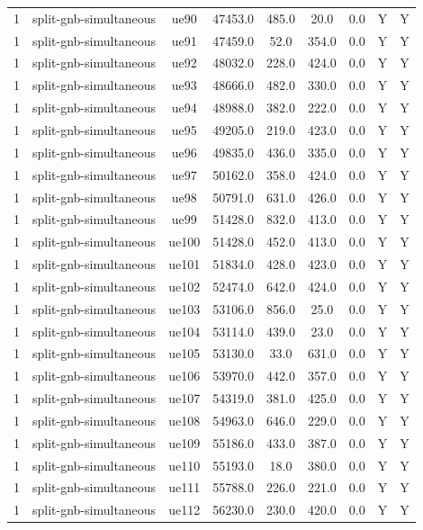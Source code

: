 \begin{table}[ht]
\begin{tabular}{|c|c|c|c|c|c|c|c|c|}
1 & split-gnb-simultaneous & ue90 & 47453.0 & 485.0 & 20.0 & 0.0 & Y & Y \\
1 & split-gnb-simultaneous & ue91 & 47459.0 & 52.0 & 354.0 & 0.0 & Y & Y \\
1 & split-gnb-simultaneous & ue92 & 48032.0 & 228.0 & 424.0 & 0.0 & Y & Y \\
1 & split-gnb-simultaneous & ue93 & 48666.0 & 482.0 & 330.0 & 0.0 & Y & Y \\
1 & split-gnb-simultaneous & ue94 & 48988.0 & 382.0 & 222.0 & 0.0 & Y & Y \\
1 & split-gnb-simultaneous & ue95 & 49205.0 & 219.0 & 423.0 & 0.0 & Y & Y \\
1 & split-gnb-simultaneous & ue96 & 49835.0 & 436.0 & 335.0 & 0.0 & Y & Y \\
1 & split-gnb-simultaneous & ue97 & 50162.0 & 358.0 & 424.0 & 0.0 & Y & Y \\
1 & split-gnb-simultaneous & ue98 & 50791.0 & 631.0 & 426.0 & 0.0 & Y & Y \\
1 & split-gnb-simultaneous & ue99 & 51428.0 & 832.0 & 413.0 & 0.0 & Y & Y \\
1 & split-gnb-simultaneous & ue100 & 51428.0 & 452.0 & 413.0 & 0.0 & Y & Y \\
1 & split-gnb-simultaneous & ue101 & 51834.0 & 428.0 & 423.0 & 0.0 & Y & Y \\
1 & split-gnb-simultaneous & ue102 & 52474.0 & 642.0 & 424.0 & 0.0 & Y & Y \\
1 & split-gnb-simultaneous & ue103 & 53106.0 & 856.0 & 25.0 & 0.0 & Y & Y \\
1 & split-gnb-simultaneous & ue104 & 53114.0 & 439.0 & 23.0 & 0.0 & Y & Y \\
1 & split-gnb-simultaneous & ue105 & 53130.0 & 33.0 & 631.0 & 0.0 & Y & Y \\
1 & split-gnb-simultaneous & ue106 & 53970.0 & 442.0 & 357.0 & 0.0 & Y & Y \\
1 & split-gnb-simultaneous & ue107 & 54319.0 & 381.0 & 425.0 & 0.0 & Y & Y \\
1 & split-gnb-simultaneous & ue108 & 54963.0 & 646.0 & 229.0 & 0.0 & Y & Y \\
1 & split-gnb-simultaneous & ue109 & 55186.0 & 433.0 & 387.0 & 0.0 & Y & Y \\
1 & split-gnb-simultaneous & ue110 & 55193.0 & 18.0 & 380.0 & 0.0 & Y & Y \\
1 & split-gnb-simultaneous & ue111 & 55788.0 & 226.0 & 221.0 & 0.0 & Y & Y \\
1 & split-gnb-simultaneous & ue112 & 56230.0 & 230.0 & 420.0 & 0.0 & Y & Y \\

\end{tabular}
\end{table}
